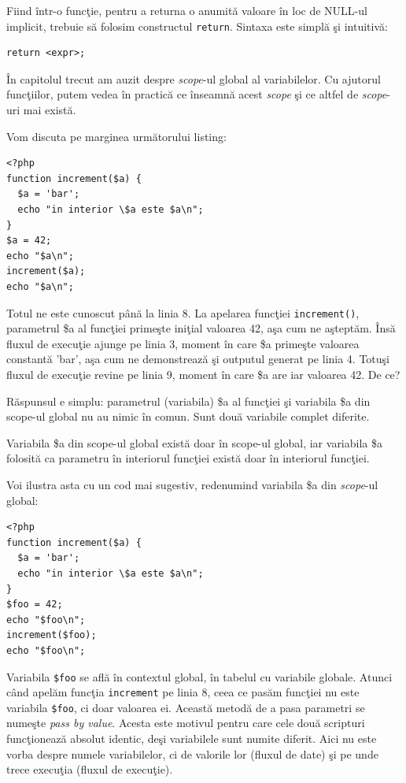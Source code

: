 Fiind într-o funcţie, pentru a returna o anumită valoare în loc
de NULL-ul implicit, trebuie să folosim
constructul \texttt{return}. Sintaxa este simplă şi intuitivă:
\begin{verbatim}
return <expr>;
\end{verbatim}

În capitolul trecut am auzit despre \textit{scope}-ul global al variabilelor.
Cu ajutorul funcţiilor, putem vedea în practică ce înseamnă acest \textit{scope}
şi ce altfel de \textit{scope}-uri mai există.

Vom discuta pe marginea următorului listing:
\begin{lstlisting}
<?php
function increment($a) {
  $a = 'bar';
  echo "in interior \$a este $a\n";
}
$a = 42;
echo "$a\n";
increment($a);
echo "$a\n";
\end{lstlisting}

Totul ne este cunoscut până la linia 8. La apelarea funcţiei \texttt{increment()},
parametrul \$a al funcţiei primeşte iniţial valoarea 42, aşa cum ne aşteptăm.
Însă fluxul de execuţie ajunge pe linia 3, moment în care \$a primeşte valoarea
constantă 'bar', aşa cum ne demonstrează şi outputul generat pe linia 4.
Totuşi fluxul de execuţie revine pe linia 9, moment în care \$a are iar valoarea 42. De ce?

Răspunsul e simplu: parametrul (variabila) \$a al funcţiei şi variabila \$a din scope-ul
global nu au nimic în comun. Sunt două variabile complet diferite.

Variabila \$a din scope-ul global există doar în scope-ul global, iar variabila \$a
folosită ca parametru în interiorul funcţiei există doar în interiorul funcţiei.

Voi ilustra asta cu un cod mai sugestiv, redenumind variabila \$a din \textsl{scope}-ul
global:
\begin{lstlisting}
<?php
function increment($a) {
  $a = 'bar';
  echo "in interior \$a este $a\n";
}
$foo = 42;
echo "$foo\n";
increment($foo);
echo "$foo\n";
\end{lstlisting}

Variabila \texttt{\$foo} se află în contextul global, în tabelul cu variabile globale. Atunci când apelăm
funcţia \texttt{increment} pe linia 8, ceea ce pasăm funcţiei nu este variabila \texttt{\$foo}, ci doar
valoarea ei. Această metodă de a pasa parametri se numeşte \textsl{pass by value}.
Acesta este motivul pentru care cele două scripturi funcţionează absolut identic, deşi
variabilele sunt numite diferit. Aici nu este vorba despre numele variabilelor, ci de
valorile lor (fluxul de date) şi pe unde trece execuţia (fluxul de execuţie).

